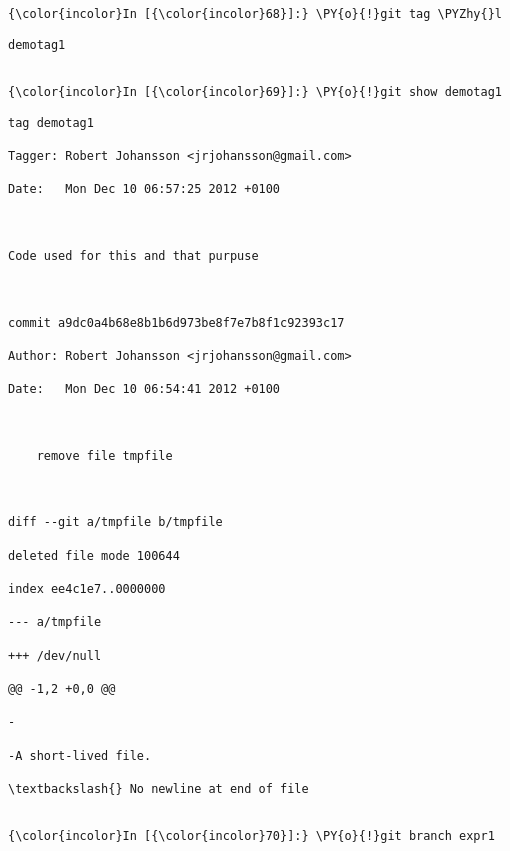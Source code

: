     \begin{Verbatim}[commandchars=\\\{\}]
{\color{incolor}In [{\color{incolor}68}]:} \PY{o}{!}git tag \PYZhy{}l 
\end{Verbatim}

    \begin{Verbatim}[commandchars=\\\{\}]
demotag1


    \end{Verbatim}

    \begin{Verbatim}[commandchars=\\\{\}]
{\color{incolor}In [{\color{incolor}69}]:} \PY{o}{!}git show demotag1
\end{Verbatim}

    \begin{Verbatim}[commandchars=\\\{\}]
tag demotag1

Tagger: Robert Johansson <jrjohansson@gmail.com>

Date:   Mon Dec 10 06:57:25 2012 +0100



Code used for this and that purpuse



commit a9dc0a4b68e8b1b6d973be8f7e7b8f1c92393c17

Author: Robert Johansson <jrjohansson@gmail.com>

Date:   Mon Dec 10 06:54:41 2012 +0100



    remove file tmpfile



diff --git a/tmpfile b/tmpfile

deleted file mode 100644

index ee4c1e7..0000000

--- a/tmpfile

+++ /dev/null

@@ -1,2 +0,0 @@

-

-A short-lived file.

\textbackslash{} No newline at end of file


    \end{Verbatim}







    \begin{Verbatim}[commandchars=\\\{\}]
{\color{incolor}In [{\color{incolor}70}]:} \PY{o}{!}git branch expr1 
\end{Verbatim}



